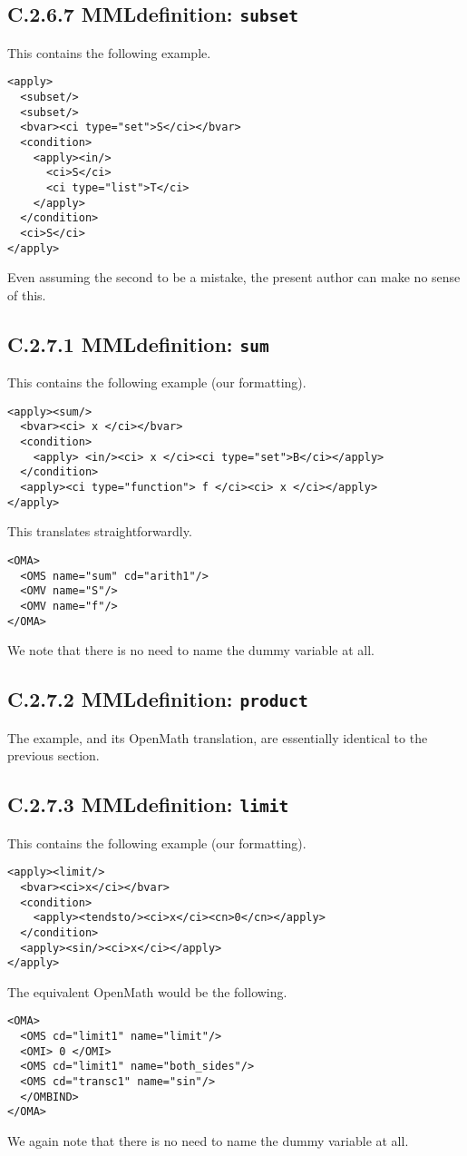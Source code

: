 \documentclass{llncs}
\begin{document}
{\subsection{C.2.6.7 MMLdefinition: {\tt subset}}\label{C267}
This contains the following example.
\begin{lstlisting}[language=MathML2]
<apply>
  <subset/>
  <subset/>
  <bvar><ci type="set">S</ci></bvar>
  <condition>
    <apply><in/>
      <ci>S</ci>
      <ci type="list">T</ci>
    </apply>
  </condition>
  <ci>S</ci>
</apply>
\end{lstlisting}
Even assuming the second {} to be a mistake, the present author
can make no sense of this.
\subsection{C.2.7.1 MMLdefinition: {\tt sum}}\label{C271}
This contains the following example (our formatting).
\begin{lstlisting}[language=MathML2]
<apply><sum/>
  <bvar><ci> x </ci></bvar>
  <condition>
    <apply> <in/><ci> x </ci><ci type="set">B</ci></apply>
  </condition>
  <apply><ci type="function"> f </ci><ci> x </ci></apply>
</apply>
\end{lstlisting}
This translates straightforwardly.
\begin{lstlisting}
<OMA>
  <OMS name="sum" cd="arith1"/>
  <OMV name="S"/>
  <OMV name="f"/>
</OMA>
\end{lstlisting}
We note that there is no need to name the dummy variable at all.
\subsection{C.2.7.2 MMLdefinition: {\tt product}}\label{C272}
The example, and its OpenMath translation, are essentially identical to the
previous section.
\subsection{C.2.7.3 MMLdefinition: {\tt limit}}\label{C273}
This contains the following example (our formatting).
\begin{lstlisting}[language=MathML2]
<apply><limit/>
  <bvar><ci>x</ci></bvar>
  <condition>
    <apply><tendsto/><ci>x</ci><cn>0</cn></apply>
  </condition>
  <apply><sin/><ci>x</ci></apply>
</apply>
\end{lstlisting}
The equivalent OpenMath would be the following.
\begin{lstlisting}
<OMA>
  <OMS cd="limit1" name="limit"/>
  <OMI> 0 </OMI>
  <OMS cd="limit1" name="both_sides"/>
  <OMS cd="transc1" name="sin"/>
  </OMBIND>
</OMA>
\end{lstlisting}
We again note that there is no need to name the dummy variable at all.
}
\end{document}
